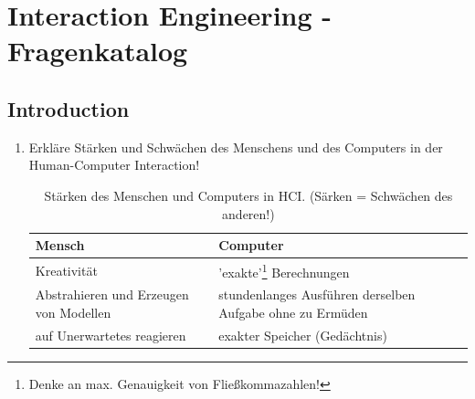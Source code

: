 \section{Interaction Engineering - Fragenkatalog}
\subsection{Introduction}
\begin{enumerate}
	\item Erkläre Stärken und Schwächen des Menschens und des Computers in der Human-Computer Interaction!
	\begin{table}[!h]
		\centering
		\begin{tabular}{|p{20em}|p{20em}|}
			\hline
			Mensch & Computer\\
			\hline
			\tabitem Kreativität & \tabitem 'exakte'\footnote{Denke an max. Genauigkeit von Fließkommazahlen!} Berechnungen\\
			\tabitem Abstrahieren und Erzeugen von Modellen & \tabitem stundenlanges Ausführen derselben Aufgabe ohne zu Ermüden\\
			\tabitem auf Unerwartetes reagieren& \tabitem exakter Speicher (Gedächtnis)\\
			\hline
		\end{tabular}
		\caption{Stärken des Menschen und Computers in HCI. (Särken = Schwächen des anderen!)}
		\label{strength_of_hc}
	\end{table}
	

\end{enumerate}
